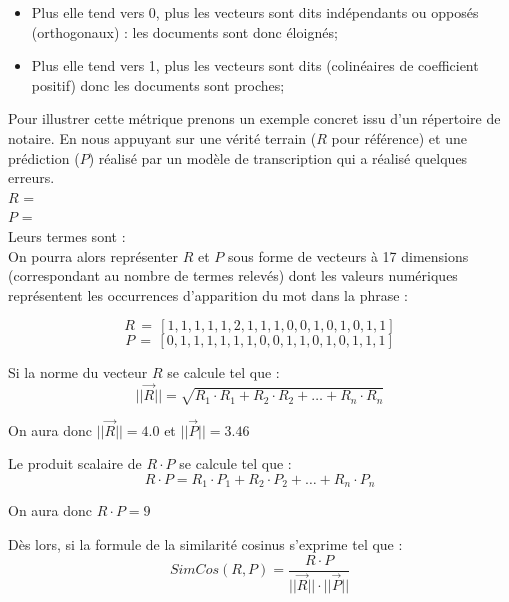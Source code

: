\begin{itemize}
    \item Plus elle tend vers 0, plus les vecteurs sont dits indépendants ou opposés (orthogonaux) : les documents sont donc éloignés;
    \item Plus elle tend vers 1, plus les vecteurs sont dits (colinéaires de coefficient positif) donc les documents sont proches;
\end{itemize}

Pour illustrer cette métrique prenons un exemple concret issu d'un répertoire de notaire. En nous appuyant sur une vérité terrain ($R$ pour référence) et une prédiction ($P$) réalisé par un modèle de transcription qui a réalisé quelques erreurs.\\

$R$ = \\

$P$ = \\

Leurs termes sont : \\

On pourra alors représenter $R$ et $P$ sous forme de vecteurs à 17 dimensions (correspondant au nombre de termes relevés) dont les valeurs numériques représentent les occurrences d'apparition du mot dans la phrase :

$$R\,=\,[1,1,1,1,1,2,1,1,1,0,0,1,0,1,0,1,1]$$
$$P\,=\,[0,1,1,1,1,1,1,0,0,1,1,0,1,0,1,1,1]$$

Si la norme du vecteur $R$ se calcule tel que : $$||\overrightarrow{R}|| = \sqrt{R_1 \cdot R_1 + R_2 \cdot R_2 + \ldots + R_n \cdot R_n}$$

On aura donc $||\overrightarrow{R}|| = 4.0 $ et $||\overrightarrow{P}|| = 3.46 $

Le produit scalaire de $R \cdot P$ se calcule tel que : $$R \cdot P = R_1 \cdot P_1 + R_2 \cdot P_2 + \ldots + R_n \cdot P_n$$

On aura donc $R \cdot P = 9$

Dès lors, si la formule de la similarité cosinus s'exprime tel que : $$SimCos(R,P) = \frac{R \cdot P}{||\overrightarrow{R}|| \cdot ||\overrightarrow{P}||}$$

